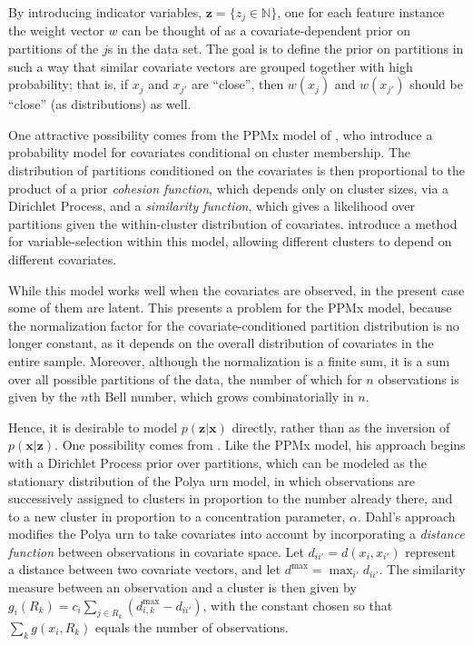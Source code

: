 \documentclass[12pt]{article}
\begin{document}
By introducing indicator variables, $\mathbf{z} = \{z_{j} \in \mathbb{N}\}$, one for each feature instance the weight vector $w$ can be thought of as a covariate-dependent prior on partitions of the $j$s in the data set.  The goal is to define the prior on partitions in such a way that similar covariate vectors are grouped together with high probability; that is, if $x_{j}$ and $x_{j'}$ are ``close'', then $w(x_{j})$ and $w(x_{j'})$ should be ``close'' (as distributions) as well.

One attractive possibility comes from the PPMx model of \cite{muller2011product}, who introduce a probability model for covariates conditional on cluster membership.  The distribution of partitions conditioned on the covariates is then proportional to the product of a prior {\it cohesion function}, which depends only on cluster sizes, via a Dirichlet Process, and a {\it similarity function}, which gives a likelihood over partitions given the within-cluster distribution of covariates.  \cite{quintana2012cluster} introduce a method for variable-selection within this model, allowing different clusters to depend on different covariates.

While this model works well when the covariates are observed, in the present case some of them are latent.  This presents a problem for the PPMx model, because the normalization factor for the covariate-conditioned partition distribution is no longer constant, as it depends on the overall distribution of covariates in the entire sample.  Moreover, although the normalization is a finite sum, it is a sum over all possible partitions of the data, the number of which for $n$ observations is given by the $n$th Bell number, which grows combinatorially in $n$.

Hence, it is desirable to model $p(\mathbf{z} \vert \mathbf{x})$ directly, rather than as the inversion of $p(\mathbf{x} \vert \mathbf{z})$.  One possibility comes from \cite{dahl2008distance}.  Like the PPMx model, his approach begins with a Dirichlet Process prior over partitions, which can be modeled as the stationary distribution of the Polya urn model, in which observations are successively assigned to clusters in proportion to the number already there, and to a new cluster in proportion to a concentration parameter, $\alpha$.  Dahl's approach modifies the Polya urn to take covariates into account by incorporating a {\em distance function} between observations in covariate space.  Let $d_{ii'} = d(x_i, x_{i'})$ represent a distance between two covariate vectors, and let $d^{\max} = \max_{i'} d_{ii'}$.  The similarity measure between an observation and a cluster is then given by $g_i(R_k) = c_i \sum_{j \in R_k} (d^{\max}_{i,k} - d_{ii'})$, with the constant chosen so that $\sum_{k} g(x_i, R_k)$ equals the number of observations.  
\end{document}
